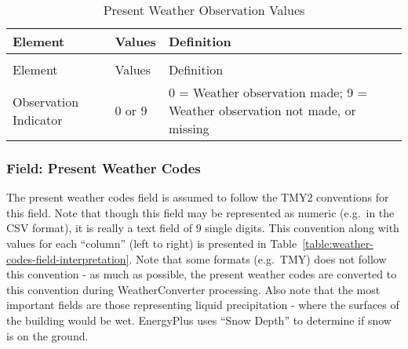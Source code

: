 \begin{longtable}[c]{p{1.5in}p{1.5in}p{3.0in}}
\caption{Present Weather Observation Values \label{table:present-weather-observation-values}} \tabularnewline
\toprule 
Element & Values & Definition \tabularnewline
\midrule
\endfirsthead

\caption[]{Present Weather Observation Values} \tabularnewline
\toprule 
Element & Values & Definition \tabularnewline
\midrule
\endhead

Observation Indicator & 0 or 9 & 0 = Weather observation made; 9 = Weather observation not made, or missing \tabularnewline
\bottomrule
\end{longtable}

\subsubsection{Field: Present Weather Codes}\label{field-present-weather-codes}

The present weather codes field is assumed to follow the TMY2 conventions for this field. Note that though this field may be represented as numeric (e.g.~in the CSV format), it is really a text field of 9 single digits. This convention along with values for each ``column'' (left to right) is presented in Table~\ref{table:weather-codes-field-interpretation}. Note that some formats (e.g.~TMY) does not follow this convention - as much as possible, the present weather codes are converted to this convention during WeatherConverter processing. Also note that the most important fields are those representing liquid precipitation - where the surfaces of the building would be wet. EnergyPlus uses ``Snow Depth'' to determine if snow is on the ground.

